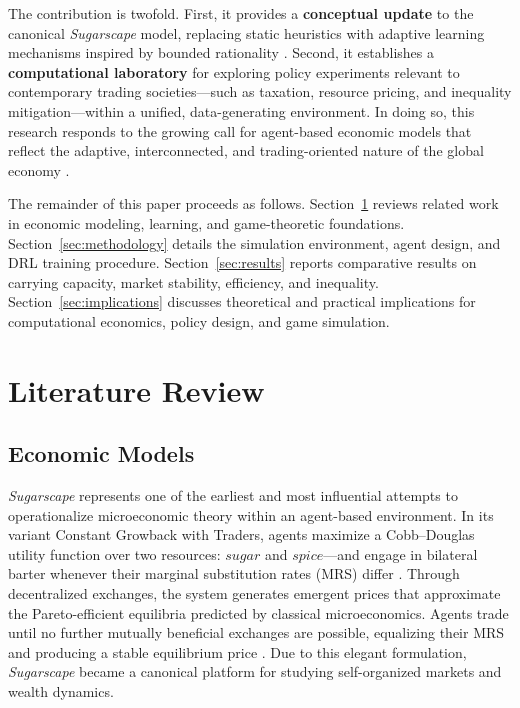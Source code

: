 \documentclass[pdflatex,sn-mathphys-num]{sn-jnl}%
\theoremstyle{thmstyleone}%
\theoremstyle{thmstyletwo}%
\theoremstyle{thmstylethree}%
\begin{document}
The contribution is twofold.  
First, it provides a \textbf{conceptual update} to the canonical \textit{Sugarscape} model, replacing static heuristics with adaptive learning mechanisms inspired by bounded rationality \citep{Simon1957}.  
Second, it establishes a \textbf{computational laboratory} for exploring policy experiments relevant to contemporary trading societies—such as taxation, resource pricing, and inequality mitigation—within a unified, data-generating environment.  
In doing so, this research responds to the growing call for agent-based economic models that reflect the adaptive, interconnected, and trading-oriented nature of the global economy \citep{Tesfatsion2017}.

The remainder of this paper proceeds as follows.  
Section~\ref{sec:literature} reviews related work in economic modeling, learning, and game-theoretic foundations.  
Section~\ref{sec:methodology} details the simulation environment, agent design, and DRL training procedure.  
Section~\ref{sec:results} reports comparative results on carrying capacity, market stability, efficiency, and inequality.  
Section~\ref{sec:implications} discusses theoretical and practical implications for computational economics, policy design, and game simulation.


\section{Literature Review}
\label{sec:literature}


\subsection{Economic Models}

\textit{Sugarscape} represents one of the earliest and most influential attempts to operationalize microeconomic theory within an agent-based environment.  
In its variant Constant Growback with Traders, agents maximize a Cobb–Douglas utility function over two resources: \(sugar\) and \(spice\)—and engage in bilateral barter whenever their marginal substitution rates (MRS) differ \citep{EpsteinAxtell1996}.  
Through decentralized exchanges, the system generates emergent prices that approximate the Pareto-efficient equilibria predicted by classical microeconomics.  
Agents trade until no further mutually beneficial exchanges are possible, equalizing their MRS and producing a stable equilibrium price \citep{Axtell2005}.  
Due to this elegant formulation, \textit{Sugarscape} became a canonical platform for studying self-organized markets and wealth dynamics.
\end{document}
